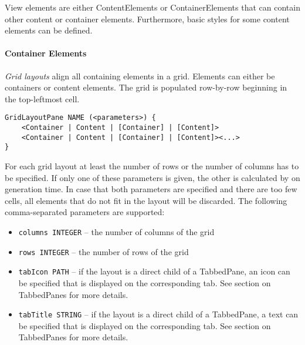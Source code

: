 
View elements are either ContentElements or ContainerElements that can contain other content or container elements. Furthermore, basic styles for some content elements can be defined.

\paragraph{Container Elements}

\textit{Grid layouts} align all containing elements in a grid. Elements can either be containers or content elements. The grid is populated row-by-row beginning in the top-leftmost cell.

\begin{lstlisting}
GridLayoutPane NAME (<parameters>) {
	<Container | Content | [Container] | [Content]>
	<Container | Content | [Container] | [Content]><...>
}
\end{lstlisting}

For each grid layout at least the number of rows or the number of columns has to be specified. If only one of these parameters is given, the other is calculated by \MD on generation time. In case that both parameters are specified and there are too few cells, all elements that do not fit in the layout will be discarded. The following comma-separated parameters are supported:
\begin{itemize}
\item \lstinline!columns INTEGER! -- the number of columns of the grid
\item \lstinline!rows INTEGER! -- the number of rows of the grid
\item \lstinline!tabIcon PATH! -- if the layout is a direct child of a TabbedPane, an icon can be specified that is displayed on the corresponding tab. See section on TabbedPanes for more details.
\item \lstinline!tabTitle STRING! -- if the layout is a direct child of a TabbedPane, a text can be specified that is displayed on the corresponding tab. See section on TabbedPanes for more details.
\end{itemize}

